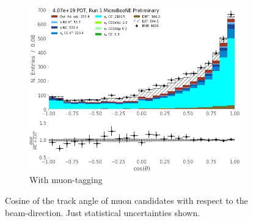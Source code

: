 \begin{figure}[H]
\begin{center}
\begin{subfigure}[b]{0.3\textwidth}
    \end{subfigure} %
    \begin{subfigure}[b]{0.3\textwidth}
    \centering
    \includegraphics[width=1.00\textwidth]{NuMuCCsel/Images/Ryan/Run1_costheta_fullSel.jpg}
    \caption{\label{fig:NuMUCCsel:ryan:trklenFull} With muon-tagging}
    \end{subfigure}
\caption{Cosine of the track angle of muon candidates with respect to the beam-direction. Just statistical uncertainties shown.}
\end{center}
\end{figure}


